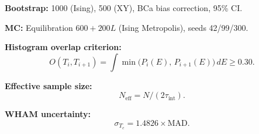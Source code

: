 \documentclass[11pt,a4paper]{article}
\begin{document}
\textbf{Bootstrap:} 1000 (Ising), 500 (XY), BCa bias correction, 95\% CI.

\textbf{MC:} Equilibration $600 + 200L$ (Ising Metropolis), seeds 42/99/300.

\textbf{Histogram overlap criterion:}
\begin{equation}
  O(T_i, T_{i+1}) = \int\min\bigl(P_i(E),\, P_{i+1}(E)\bigr)\,dE \geq 0.30.
\end{equation}

\textbf{Effective sample size:}
\begin{equation}
  N_{\text{eff}} = N/(2\tau_{\text{int}}).
\end{equation}

\textbf{WHAM uncertainty:}
\begin{equation}
  \sigma_{T_c} = 1.4826 \times \mathrm{MAD}.
\end{equation}
\end{document}
